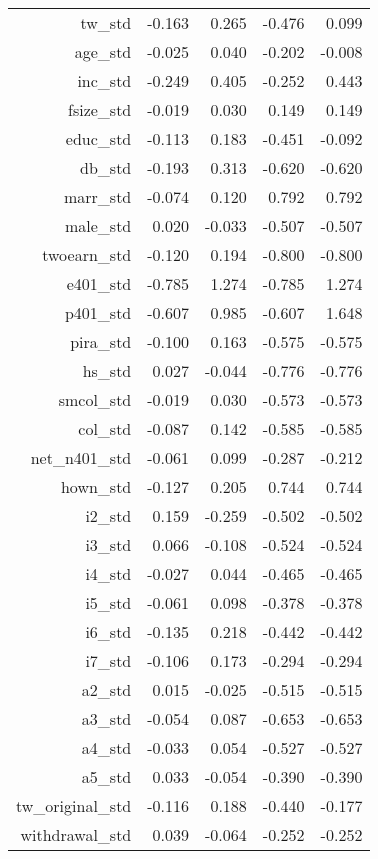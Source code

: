 \begin{table}[ht]
\begin{tabular}{rrrrr}
  tw\_std & -0.163 & 0.265 & -0.476 & 0.099 \\ 
  age\_std & -0.025 & 0.040 & -0.202 & -0.008 \\ 
  inc\_std & -0.249 & 0.405 & -0.252 & 0.443 \\ 
  fsize\_std & -0.019 & 0.030 & 0.149 & 0.149 \\ 
  educ\_std & -0.113 & 0.183 & -0.451 & -0.092 \\ 
  db\_std & -0.193 & 0.313 & -0.620 & -0.620 \\ 
  marr\_std & -0.074 & 0.120 & 0.792 & 0.792 \\ 
  male\_std & 0.020 & -0.033 & -0.507 & -0.507 \\ 
  twoearn\_std & -0.120 & 0.194 & -0.800 & -0.800 \\ 
  e401\_std & -0.785 & 1.274 & -0.785 & 1.274 \\ 
  p401\_std & -0.607 & 0.985 & -0.607 & 1.648 \\ 
  pira\_std & -0.100 & 0.163 & -0.575 & -0.575 \\ 
  hs\_std & 0.027 & -0.044 & -0.776 & -0.776 \\ 
  smcol\_std & -0.019 & 0.030 & -0.573 & -0.573 \\ 
  col\_std & -0.087 & 0.142 & -0.585 & -0.585 \\ 
  net\_n401\_std & -0.061 & 0.099 & -0.287 & -0.212 \\ 
  hown\_std & -0.127 & 0.205 & 0.744 & 0.744 \\ 
  i2\_std & 0.159 & -0.259 & -0.502 & -0.502 \\ 
  i3\_std & 0.066 & -0.108 & -0.524 & -0.524 \\ 
  i4\_std & -0.027 & 0.044 & -0.465 & -0.465 \\ 
  i5\_std & -0.061 & 0.098 & -0.378 & -0.378 \\ 
  i6\_std & -0.135 & 0.218 & -0.442 & -0.442 \\ 
  i7\_std & -0.106 & 0.173 & -0.294 & -0.294 \\ 
  a2\_std & 0.015 & -0.025 & -0.515 & -0.515 \\ 
  a3\_std & -0.054 & 0.087 & -0.653 & -0.653 \\ 
  a4\_std & -0.033 & 0.054 & -0.527 & -0.527 \\ 
  a5\_std & 0.033 & -0.054 & -0.390 & -0.390 \\ 
  tw\_original\_std & -0.116 & 0.188 & -0.440 & -0.177 \\ 
  withdrawal\_std & 0.039 & -0.064 & -0.252 & -0.252 \\ 

\end{tabular}
\end{table}
